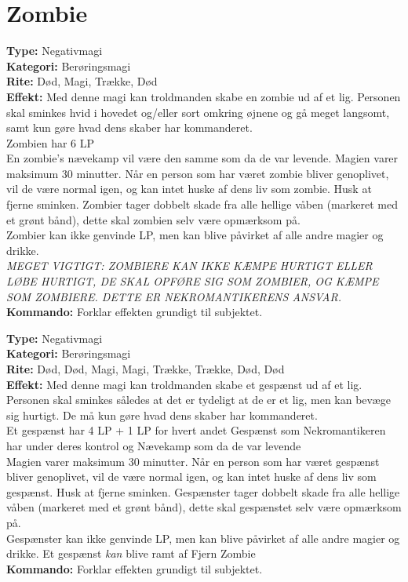 \section{Zombie}
\begin{zombie*}
\textbf{Type:} Negativmagi\\
\textbf{Kategori:} Berøringsmagi\\
\textbf{Rite:} Død, Magi, Trække, Død\\
\textbf{Effekt:} Med denne magi kan troldmanden skabe en zombie ud af et lig. Personen skal sminkes hvid i hovedet og/eller sort omkring øjnene og gå meget langsomt, samt kun gøre hvad dens skaber har kommanderet.\\
Zombien har 6 LP\\
En zombie's nævekamp vil være den samme som da de var levende. Magien varer maksimum 30 minutter. Når en person som har været zombie bliver genoplivet, vil de være normal igen, og kan intet huske af dens liv som zombie. Husk at fjerne sminken. Zombier tager dobbelt skade fra alle hellige våben (markeret med et grønt bånd), dette skal zombien selv være opmærksom på.\\ 
Zombier kan ikke genvinde LP, men kan blive påvirket af alle andre magier og drikke.\\
\textit{MEGET VIGTIGT: ZOMBIERE KAN IKKE KÆMPE HURTIGT ELLER LØBE HURTIGT, DE SKAL OPFØRE SIG SOM ZOMBIER, OG KÆMPE SOM ZOMBIERE. DETTE ER NEKROMANTIKERENS ANSVAR.}\\
\textbf{Kommando:} Forklar effekten grundigt til subjektet.\\
\end{zombie*}

\begin{zombie*}
\textbf{Type:} Negativmagi\\
\textbf{Kategori:} Berøringsmagi\\
\textbf{Rite:} Død, Død, Magi, Magi, Trække, Trække, Død, Død\\
\textbf{Effekt:} Med denne magi kan troldmanden skabe et gespænst ud af et lig. Personen skal sminkes således at det er tydeligt at de er et lig, men kan bevæge sig hurtigt. De må kun gøre hvad dens skaber har kommanderet.\\
Et gespænst har 4 LP + 1 LP for hvert andet Gespænst som Nekromantikeren har under deres kontrol og Nævekamp som da de var levende\\
Magien varer maksimum 30 minutter. Når en person som har været gespænst bliver genoplivet, vil de være normal igen, og kan intet huske af dens liv som gespænst. Husk at fjerne sminken. Gespænster tager dobbelt skade fra alle hellige våben (markeret med et grønt bånd), dette skal gespænstet selv være opmærksom på.\\ 
Gespænster kan ikke genvinde LP, men kan blive påvirket af alle andre magier og drikke. Et gespænst \emph{kan} blive ramt af Fjern Zombie\\
\textbf{Kommando:} Forklar effekten grundigt til subjektet.\\
\end{zombie*}

